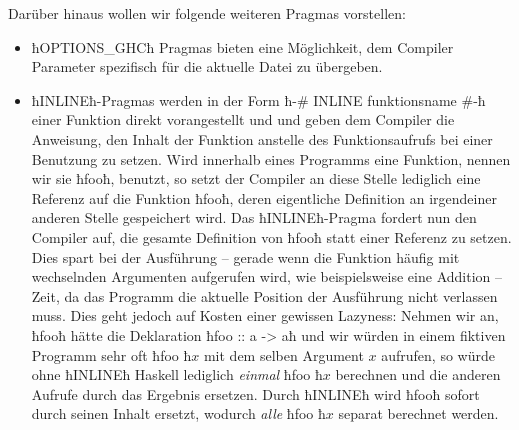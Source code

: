 Darüber hinaus wollen wir folgende weiteren Pragmas vorstellen:
\begin{itemize}
  \item ħOPTIONS\_GHCħ Pragmas bieten eine Möglichkeit, dem Compiler
    Parameter spezifisch für die aktuelle Datei zu übergeben.
  \item ħINLINEħ-Pragmas werden in der Form
    ħ{-# INLINE funktionsname #-}ħ einer Funktion direkt vorangestellt und 
    und geben dem Compiler die Anweisung, den Inhalt der Funktion anstelle des
    Funktionsaufrufs bei einer Benutzung zu setzen. Wird innerhalb eines
    Programms eine Funktion, nennen wir sie ħfooħ, benutzt, so setzt der
    Compiler an diese Stelle lediglich eine Referenz auf die Funktion ħfooħ,
    deren eigentliche Definition an irgendeiner anderen Stelle gespeichert wird.
    Das ħINLINEħ-Pragma fordert nun den Compiler auf, die gesamte Definition 
    von ħfooħ statt einer Referenz zu setzen. Dies spart
    bei der Ausführung -- gerade wenn die Funktion häufig mit wechselnden
    Argumenten aufgerufen wird, wie
    beispielsweise eine Addition -- Zeit, da das Programm die aktuelle Position
    der Ausführung nicht verlassen muss. Dies geht jedoch auf Kosten einer gewissen
    Lazyness: Nehmen wir an, ħfooħ hätte die Deklaration ħfoo :: a -> aħ und wir
    würden in einem fiktiven Programm sehr oft ħfoo ħ$x$ mit dem selben Argument
    $x$ aufrufen, so würde ohne ħINLINEħ Haskell lediglich \emph{einmal}
    ħfoo ħ$x$ berechnen und die anderen Aufrufe durch das Ergebnis ersetzen.
    Durch ħINLINEħ wird ħfooħ sofort durch seinen Inhalt ersetzt, wodurch 
    \emph{alle} ħfoo ħ$x$ separat berechnet werden. 
\end{itemize}
